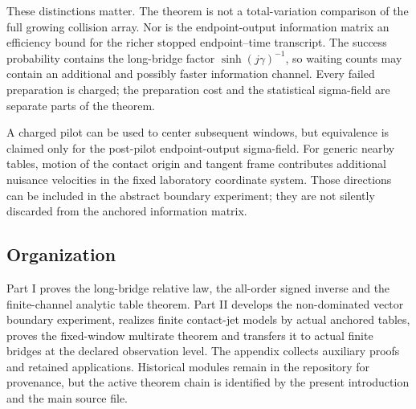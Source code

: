 These distinctions matter.  The theorem is not a total-variation comparison
of the full growing collision array.  Nor is the endpoint-output information
matrix an efficiency bound for the richer stopped endpoint--time transcript.
The success probability contains the long-bridge factor
$\sinh(j\gamma)^{-1}$, so waiting counts may contain an additional and
possibly faster information channel.  Every failed preparation is charged;
the preparation cost and the statistical sigma-field are separate parts of
the theorem.

A charged pilot can be used to center subsequent windows, but equivalence is
claimed only for the post-pilot endpoint-output sigma-field.  For generic
nearby tables, motion of the contact origin and tangent frame contributes
additional nuisance velocities in the fixed laboratory coordinate system.
Those directions can be included in the abstract boundary experiment; they
are not silently discarded from the anchored information matrix.

\subsection{Organization}

Part I proves the long-bridge relative law, the all-order signed inverse and
the finite-channel analytic table theorem.  Part II develops the
non-dominated vector boundary experiment, realizes finite contact-jet models
by actual anchored tables, proves the fixed-window multirate theorem and
transfers it to actual finite bridges at the declared observation level.  The
appendix collects auxiliary proofs and retained applications.  Historical
modules remain in the repository for provenance, but the active theorem chain
is identified by the present introduction and the main source file.
